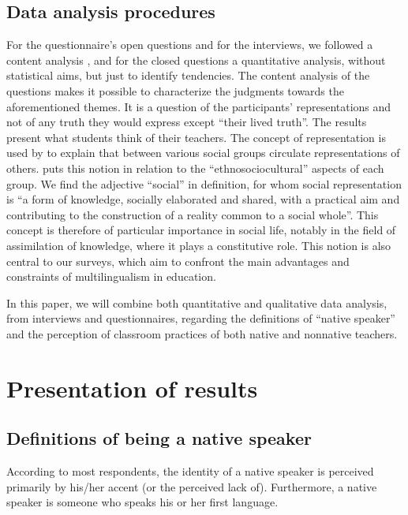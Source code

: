 \documentclass[output=paper]{../langscibook}
\begin{document}
\subsection{Data analysis procedures}

For the questionnaire’s open questions and for the interviews, we followed a content analysis \citep{Bardin1993}, and for the closed questions a quantitative analysis, without statistical aims, but just to identify tendencies. The content analysis of the questions makes it possible to characterize the judgments towards the aforementioned themes. It is a question of the participants’ representations and not of any truth they would express except “their lived truth”. The results present what students think of their teachers. The concept of representation is used by \citet{Durkheim1960} to explain that between various social groups circulate representations of others. \citet{Boyer1995} puts this notion in relation to the “ethnosociocultural” aspects of each group. We find the adjective “social” in  definition, for whom social representation is “a form of knowledge, socially elaborated and shared, with a practical aim and contributing to the construction of a reality common to a social whole”. This concept is therefore of particular importance in social life, notably in the field of assimilation of knowledge, where it plays a constitutive role. This notion is also central to our surveys, which aim to confront the main advantages and constraints of multilingualism in education.

In this paper, we will combine both quantitative and qualitative data analysis, from interviews and questionnaires, regarding the definitions of “native speaker” and the perception of classroom practices of both native and nonnative teachers.

\section{Presentation of results}

\subsection{Definitions of being a native speaker}

According to most respondents, the identity of a native speaker is perceived primarily by his/her accent (or the perceived lack of). Furthermore, a native speaker is someone who speaks his or her first language. 
\end{document}
